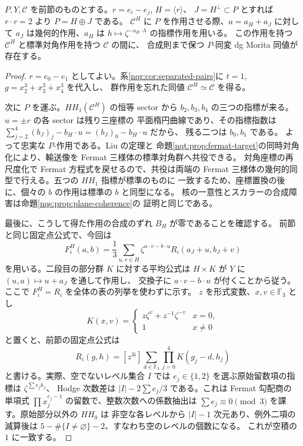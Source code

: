 \begin{lemma}[一つの差ベクトルでの群作用付き同値]
\label{nqr:lem:one-root}
$P,Y,\mathcal C$ を前節のものとする。$r=e_i-e_j$, $H=\langle r\rangle$、
$J=H^\perp\subset P$ とすれば $r\cdot r=2$ より $P=H\oplus J$ である。
$\mathcal C^H$ に $P$ を作用させる際、$a=a_H+a_J$ に対して
$a_J$ は幾何的作用、$a_H$ は $h\mapsto\zeta^{-a_H\cdot h}$ の指標作用を用いる。
この作用を持つ $\mathcal C^H$ と標準対角作用を持つ $\mathcal C$ の間に、
合成則まで保つ $P$-同変 dg Morita 同値が存在する。
\end{lemma}
\begin{proof}
$r=e_0-e_1$ としてよい。系\ref{nqr:cor:separated-pairs}に
$t=1$, $g=x_2^3+x_3^3+x_4^3$ を代入し、
群作用を忘れた同値 $\mathcal C^H\simeq\mathcal C$ を得る。

次に $P$ を運ぶ。$HH_1(\mathcal C^H)$ の恒等 sector から
$b_2,b_3,b_4$ の三つの指標が来る。$u=\pm r$ の各 sector は残り三座標の
平面楕円曲線であり、その指標指数は
$\sum_{j=2}^4(b_J)_j-b_H\cdot u=(b_J)_0-b_H\cdot u$ だから、
残る二つは $b_0,b_1$ である。
よって忠実な $P$-作用である。Liu の定理と
命題\ref{nqt:prop:fermat-target}の同時対角化により、輸送像を
Fermat 三様体の標準対角群へ共役できる。
対角座標の再尺度化で Fermat 方程式を戻せるので、共役は両端の
Fermat 三様体の幾何的同型で行える。五つの $HH_1$ 指標が標準のものに
一致するため、座標置換の後に、個々の $b$ の作用は標準の $b$ と同型になる。
核の一意性とスカラーの合成障害は命題\ref{nqs:prop:plane-coherence}の
証明と同じである。

最後に、こうして得た作用の合成のずれ $B_H$ が零であることを確認する。
前節と同じ固定点公式で、今回は
\[
 F_i^H(a,b)=\frac13\sum_{u,v\in H}\zeta^{a\cdot v-b\cdot u}
 R_i(a_J+u,b_J+v)
\]
を用いる。二段目の部分群 $K$ に対する平均公式は
$H\times K$ が $Y$ に $(u,a)\mapsto u+a_J$ を通して作用し、
交換子に $a\cdot v-b\cdot u$ が付くことから従う。
ここで $F_i^H=R_i$ を全体の表の列挙を使わずに示す。
$z$ を形式変数、$x,v\in\mathbb F_3$ とし
\[
 K(x,v)=
 \begin{cases}
 z\zeta^v+z^{-1}\zeta^{-v}&x=0,\\
 1&x\ne0
 \end{cases}
\]
と置くと、前節の固定点公式は
\[
 R_i(g,h)=[z^{3i}]\sum_{d\in\mathbb F_3}\prod_{j=0}^4K(g_j-d,h_j)
\]
と書ける。実際、空でないレベル集合 $I$ では
$e_j\in\{1,2\}$ を選ぶ原始留数項の指標は $\zeta^{\sum e_j h_j}$、
Hodge 次数差は $|I|-2\sum e_j/3$ である。これは Fermat 勾配商の
単項式 $\prod x_j^{e_j-1}$ の留数で、整数次数への係数抽出は
$\sum e_j\equiv0\pmod3$ を課す。原始部分以外の $HH_0$ は
非空な各レベルから $|I|-1$ 次元あり、例外二項の減算後は
$5-\#\{I\ne\varnothing\}-2$、すなわち空のレベルの個数になる。
これが空積の $1$ に一致する。


\end{proof}
